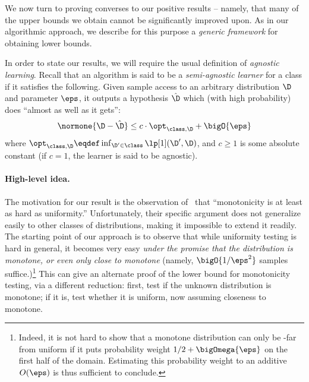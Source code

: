 We now turn to proving converses to our positive results -- namely, that many of the upper bounds we obtain cannot be significantly improved upon. As in our algorithmic approach, we describe for this purpose a \emph{generic framework} for obtaining lower bounds.

In order to state our results, we will require the usual definition of \emph{agnostic learning}. Recall that an algorithm is said to be a \emph{semi-agnostic learner} for a class \class if it satisfies the following. Given sample access to an arbitrary distribution $\D$ and parameter $\eps$, it outputs a hypothesis $\hat{\D}$ which (with high probability) does ``almost as well as it gets'':
\[
	\normone{\D - \hat{\D}} \leq c\cdot\opt_{\class,\D} + \bigO{\eps}
\]
where $\opt_{\class,\D}\eqdef \inf_{\D^\prime\in\class} \lp[1](\D^\prime,\D)$, and $c\geq 1$ is some absolute constant (if $c=1$, the learner is said to be agnostic).

\paragraph{High-level idea.} The motivation for our result is the observation of~\cite{BKR:04} that ``monotonicity is at least as hard as uniformity.'' Unfortunately, their specific argument does not generalize easily to other classes of distributions, making it impossible to extend it readily. The starting point of our approach is to observe that while uniformity testing is hard in general, it becomes very easy \emph{under the promise that the distribution is monotone, or even only close to monotone} (namely, $\bigO{1/\eps^2}$ samples suffice.)\footnote{Indeed, it is not hard to show that a monotone distribution can only be \eps-far from uniform if it puts probability weight $1/2+\bigOmega{\eps}$ on the first half of the domain. Estimating this probability weight to an additive $O(\eps)$ is thus sufficient to conclude.} This can give an alternate proof of the lower bound for monotonicity testing, via a different reduction: first, test if  the unknown distribution is monotone; if it is, test whether it is uniform, now assuming closeness to monotone.

